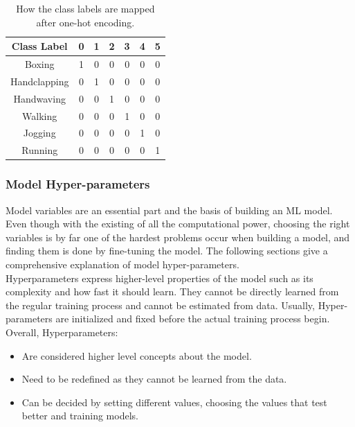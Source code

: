\begin{table}[]
\centering
\begin{tabular}{|c|c|c|c|c|c|c|}
\hline
\textbf{Class Label} & \textbf{0} & \textbf{1} & \textbf{2} & \textbf{3} & \textbf{4} & \textbf{5} \\ \hline
Boxing               & 1          & 0          & 0          & 0          & 0          & 0          \\ \hline
Handclapping         & 0          & 1          & 0          & 0          & 0          & 0          \\ \hline
Handwaving           & 0          & 0          & 1          & 0          & 0          & 0          \\ \hline
Walking              & 0          & 0          & 0          & 1          & 0          & 0          \\ \hline
Jogging              & 0          & 0          & 0          & 0          & 1          & 0          \\ \hline
Running              & 0          & 0          & 0          & 0          & 0          & 1          \\ \hline
\end{tabular}
\caption{How the class labels are mapped after one-hot encoding.}
\label{my-label}
\end{table}

\subsubsection{Model Hyper-parameters}
\hspace{5mm} Model variables are an essential part and the basis of building an ML model. Even though with the existing of all the computational power, choosing the right variables is by far one of the hardest problems occur when building a model, and finding them is done by fine-tuning the model. The following sections give a comprehensive explanation of model hyper-parameters.\\

Hyperparameters express higher-level properties of the model such as its complexity and how fast it should learn. They cannot be directly learned from the regular training process and cannot be estimated from data. Usually, Hyper-parameters are initialized and fixed before the actual training process begin.\\

Overall, Hyperparameters:
\begin{itemize}
\item Are considered higher level concepts about the model.
\item Need to be redefined as they cannot be learned from the data.
\item Can be decided by setting different values, choosing the values that test better and training models.
\end{itemize}\\

